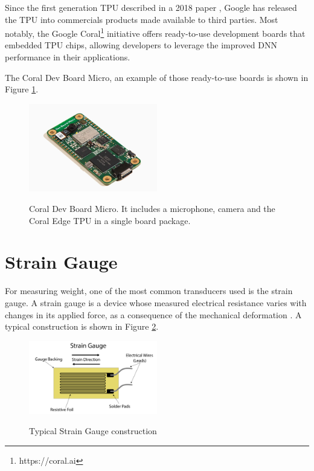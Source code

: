 Since the first generation TPU described in a 2018 paper \cite{Google2015},
Google has released the TPU into commercials products made available to third
parties. Most notably, the Google Coral\footnote{https://coral.ai} initiative
offers ready-to-use development boards that embedded TPU chips, allowing
developers to leverage the improved DNN performance in their applications.

The Coral Dev Board Micro, an example of those ready-to-use boards is shown in
Figure \ref{fig:coraldev}.

\begin{figure}[H]
	\centering
	\caption[Coral Dev Board Micro]{Coral Dev Board Micro. It includes a microphone, camera and the Coral Edge TPU in a single board package.}
    \includegraphics[width=0.5\textwidth]{./images/coralboard.png}
    \label{fig:coraldev}
\end{figure}

\section{Strain Gauge}

For measuring weight, one of the most common transducers used is the strain
gauge. A strain gauge is a device whose measured electrical resistance varies
with changes in its applied force, as a consequence of the mechanical
deformation \cite{Stefanescu}. A typical construction is shown in Figure 
\ref{fig:gauge1}.

\begin{figure}[H]
	\centering
	\caption[Typical Strain Gauge construction]{Typical Strain Gauge construction}
    \includegraphics[width=0.5\textwidth]{./images/straingauge.png}
	\label{fig:gauge1}
\end{figure}


